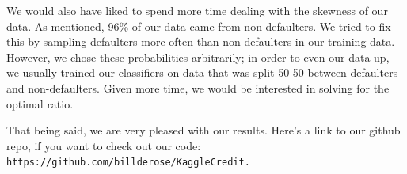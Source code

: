 \documentclass[11pt, oneside]{article}   	%
\begin{document}
		
	We would also have liked to spend more time dealing with the skewness of our data. As mentioned, 96\% of our data came from non-defaulters. We tried to fix this by sampling
	defaulters more often than non-defaulters in our training data. However, we chose these probabilities arbitrarily; in order to even our data up, we usually trained our classifiers on data that was split 50-50 between defaulters and non-defaulters. Given more time, we would be interested in solving for the optimal ratio.
	
	
	That being said, we are very pleased with our results. Here's a link to our github repo, if you want to check out our code: \tt https://github.com/billderose/KaggleCredit.
\end{document}
